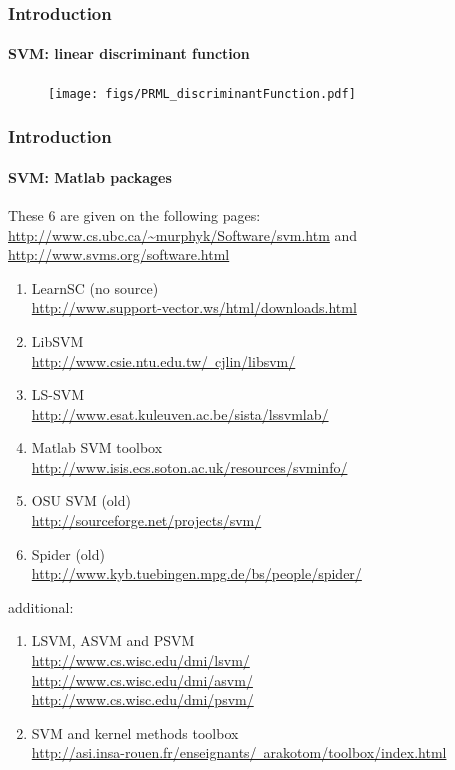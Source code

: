 \begin{frame}
\frametitle{Introduction}
\framesubtitle{SVM: linear discriminant function}
\logoCSIPCPL\mypagenum
	\begin{figure}				
		\texttt{[image: figs/PRML\_discriminantFunction.pdf]}
	\end{figure}
\end{frame}



\begin{frame}
\frametitle{Introduction}
\framesubtitle{SVM: Matlab packages}
\logoCSIPCPL\mypagenum
	\tiny
	These 6 are given on the following pages:
{\color{blue}  \href{http://www.cs.ubc.ca/~murphyk/Software/svm.htm}{http://www.cs.ubc.ca/\textasciitilde murphyk/Software/svm.htm}} and
{\color{blue}  \href{http://www.svms.org/software.html}{http://www.svms.org/software.html}}
	\tiny
	\begin{enumerate}
		\item LearnSC (no source)\\ 
{\color{blue} \href{http://www.support-vector.ws/html/downloads.html}
{http://www.support-vector.ws/html/downloads.html }}
		\item LibSVM \\
{\color{blue}  \href{http://www.csie.ntu.edu.tw/~cjlin/libsvm/}{http://www.csie.ntu.edu.tw/~cjlin/libsvm/}}
		\item LS-SVM\\
{\color{blue}\href{http://www.esat.kuleuven.ac.be/sista/lssvmlab/ }
{http://www.esat.kuleuven.ac.be/sista/lssvmlab/ }}
		\item Matlab SVM toolbox \\ 
{\color{blue} \href{http://www.isis.ecs.soton.ac.uk/resources/svminfo/}{http://www.isis.ecs.soton.ac.uk/resources/svminfo/}}
		\item OSU SVM (old)\\
{\color{blue} \href{http://sourceforge.net/projects/svm/}
{http://sourceforge.net/projects/svm/}}
		\item Spider (old)\\ 
{\color{blue} \href{http://www.kyb.tuebingen.mpg.de/bs/people/spider/}{http://www.kyb.tuebingen.mpg.de/bs/people/spider/}}
	\end{enumerate}
	additional:
	\tiny
	\begin{enumerate}
	\item LSVM, ASVM and PSVM\\
{\color{blue} \href{http://www.cs.wisc.edu/dmi/lsvm/}
{http://www.cs.wisc.edu/dmi/lsvm/}}\\
{\color{blue} \href{http://www.cs.wisc.edu/dmi/asvm/}
{http://www.cs.wisc.edu/dmi/asvm/}}\\
{\color{blue} \href{http://www.cs.wisc.edu/dmi/psvm/}
{http://www.cs.wisc.edu/dmi/psvm/}}
	\item SVM and kernel methods toolbox\\
{\color{blue} \href{http://asi.insa-rouen.fr/enseignants/~arakotom/toolbox/index.html}
{http://asi.insa-rouen.fr/enseignants/~arakotom/toolbox/index.html}}\\
	\end{enumerate}
\end{frame}

